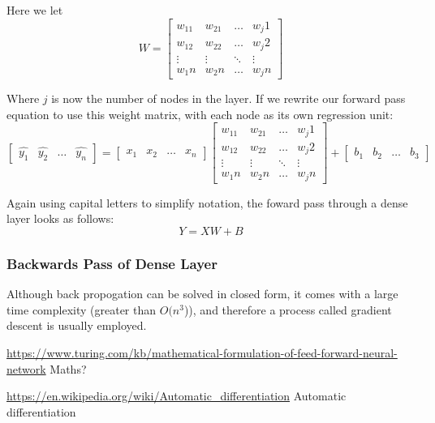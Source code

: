 \documentclass{article}
\begin{document}
    Here we let
    \begin{displaymath}
        W = \begin{bmatrix}
            w_11 & w_21 & \dots & w_j1\\
            w_12 & w_22 & \dots & w_j2\\
            \vdots & \vdots & \ddots & \vdots\\
            w_1n & w_2n & \dots & w_jn
        \end{bmatrix}
    \end{displaymath}

    Where $j$ is now the number of nodes in the layer. If we rewrite our forward pass equation to use this weight matrix,
    with each node as its own regression unit:
    \begin{displaymath}
        \begin{bmatrix}
            \hat{y_1}&
            \hat{y_2}&
            \hdots&
            \hat{y_n}
        \end{bmatrix} = \begin{bmatrix}
            x_1&
            x_2&
            \hdots&
            x_n
        \end{bmatrix} \begin{bmatrix}
            w_11 & w_21 & \dots & w_j1\\
            w_12 & w_22 & \dots & w_j2\\
            \vdots & \vdots & \ddots & \vdots\\
            w_1n & w_2n & \dots & w_jn
        \end{bmatrix} + \begin{bmatrix}
           b_1 & b_2 & \dots & b_3
        \end{bmatrix}
    \end{displaymath}


    Again using capital letters to simplify notation, the foward pass through a dense layer looks as follows:
    \begin{displaymath}
        Y = XW + B
    \end{displaymath}

    \subsubsection{Backwards Pass of Dense Layer}
    Although back propogation can be solved in closed form, it comes with a large time complexity (greater than $O(n^3$)), and therefore
    a process called gradient descent is usually employed.


    \pagebreak
    \noindent \url{https://www.turing.com/kb/mathematical-formulation-of-feed-forward-neural-network} Maths?

    \noindent \url{https://en.wikipedia.org/wiki/Automatic_differentiation} Automatic differentiation
\end{document}
